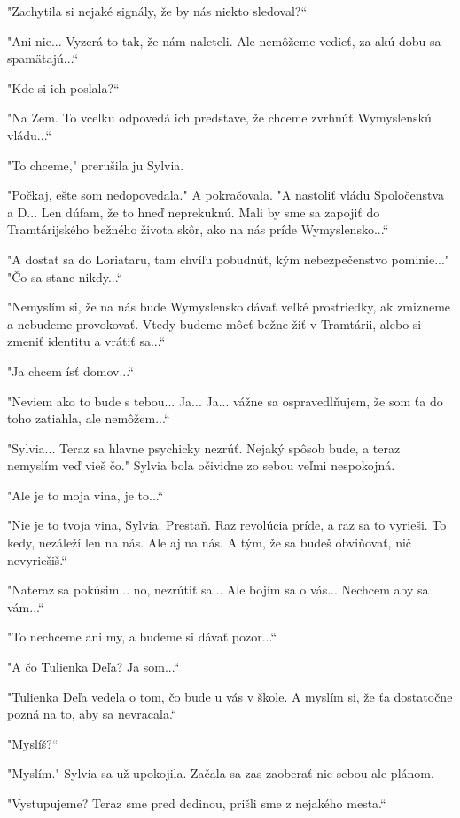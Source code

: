 \documentclass{book}
\begin{document}
"$ $Zachytila si nejaké signály, že by nás niekto sledoval?“

"$ $Ani nie... Vyzerá to tak, že nám naleteli. Ale nemôžeme vedieť, za akú dobu sa spamätajú...“

"$ $Kde si ich poslala?“

"$ $Na Zem. To vcelku odpovedá ich predstave, že chceme zvrhnúť Wymyslenskú vládu...“

"$ $To chceme,"$ $ prerušila ju Sylvia.

"$ $Počkaj, ešte som nedopovedala."$ $ A pokračovala. "$ $A nastoliť vládu Spoločenstva a D... Len dúfam, že to hneď neprekuknú. Mali by sme sa zapojiť do Tramtárijského bežného života skôr, ako na nás príde Wymyslensko...“

"$ $A dostať sa do Loriataru, tam chvíľu pobudnúť, kým nebezpečenstvo pominie..."$ $ "$ $Čo sa stane nikdy...“

"$ $Nemyslím si, že na nás bude Wymyslensko dávať veľké prostriedky, ak zmizneme a nebudeme provokovať. Vtedy budeme môcť bežne žiť v Tramtárii, alebo si zmeniť identitu a vrátiť sa...“

"$ $Ja chcem ísť domov...“

"$ $Neviem ako to bude s tebou... Ja... Ja... vážne sa ospravedlňujem, že som ťa do toho zatiahla, ale nemôžem...“

"$ $Sylvia... Teraz sa hlavne psychicky nezrúť. Nejaký spôsob bude, a teraz nemyslím veď vieš čo."$ $ Sylvia bola očividne zo sebou veľmi nespokojná.

"$ $Ale je to moja vina, je to...“

"$ $Nie je to tvoja vina, Sylvia. Prestaň. Raz revolúcia príde, a raz sa to vyrieši. To kedy, nezáleží len na nás. Ale aj na nás. A tým, že sa budeš obviňovať, nič nevyriešiš.“

"$ $Nateraz sa pokúsim... no, nezrútiť sa... Ale bojím sa o vás... Nechcem aby sa vám...“

"$ $To nechceme ani my, a budeme si dávať pozor...“

"$ $A čo Tulienka Deľa? Ja som...“

"$ $Tulienka Deľa vedela o tom, čo bude u vás v škole. A myslím si, že ťa dostatočne pozná na to, aby sa nevracala.“

"$ $Myslíš?“

"$ $Myslím."$ $ Sylvia sa už upokojila. Začala sa zas zaoberať nie sebou ale plánom.

"$ $Vystupujeme? Teraz sme pred dedinou, prišli sme z nejakého mesta.“
\end{document}
